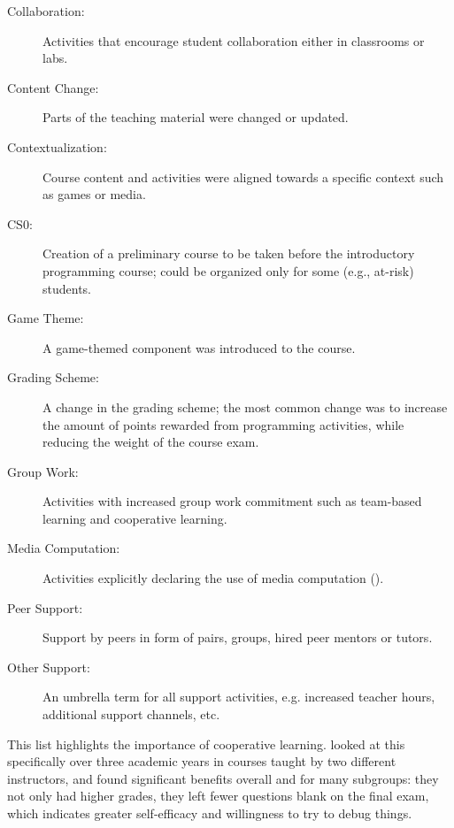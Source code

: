 \begin{description}

\item[Collaboration:]
  Activities that encourage student collaboration either in classrooms or labs.

\item[Content Change:]
  Parts of the teaching material were changed or updated.

\item[Contextualization:]
  Course content and activities were aligned towards a specific context such as games or media.

\item[CS0:]
  Creation of a preliminary course to be taken before the introductory programming course; could be organized only for some (e.g., at-risk) students.

\item[Game Theme:]
  A game-themed component was introduced to the course.

\item[Grading Scheme:]
  A change in the grading scheme; the most common change was to increase the amount of points rewarded from programming activities, while reducing the weight of the course exam.

\item[Group Work:]
  Activities with increased group work commitment such as team-based learning and cooperative learning.

\item[Media Computation:]
  Activities explicitly declaring the use of media computation ().

\item[Peer Support:]
  Support by peers in form of pairs, groups, hired peer mentors or tutors.

\item[Other Support:]
  An umbrella term for all support activities, e.g. increased teacher hours, additional support channels, etc.

\end{description}


This list highlights the importance of cooperative learning. \cite{Beck2013} looked at this specifically over three academic years in courses taught by two different instructors, and found significant benefits overall and for many subgroups: they not only had higher grades, they left fewer questions blank on the final exam, which indicates greater self-efficacy and willingness to try to debug things.

